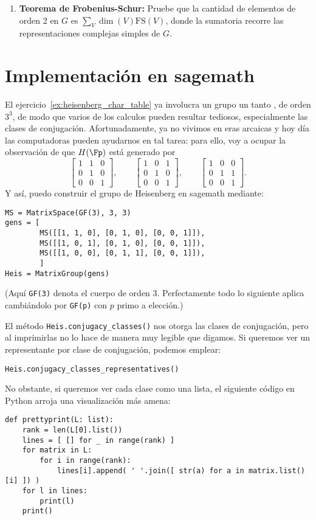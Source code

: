 \documentclass[11pt, reqno]{amsart}
\begin{document}
\begin{additional}
\begin{enumerate}
\begin{enumerate}
			\item \textbf{Teorema de Frobenius-Schur:}
				Pruebe que la cantidad de elementos de orden 2 en $G$ es $\sum_V \dim(V)\mathrm{FS}(V)$, donde la sumatoria
				recorre las representaciones complejas simples de $G$.
		\end{enumerate}
\end{enumerate}

\section{Implementación en \textsf{sagemath}}
El ejercicio~\ref{ex:heisenberg_char_table} ya involucra un grupo un tanto , de orden $3^3$, de modo que varios de los calculos pueden resultar tediosos,
especialmente las clases de conjugación.
Afortunadamente, ya no vivimos en eras arcaicas y hoy día las computadoras pueden ayudarnos en tal tarea:
para ello, voy a ocupar la observación de que $H(\Fp)$ está generado por
\[
	\begin{bmatrix}
		1 & 1 & 0 \\
		0 & 1 & 0 \\
		0 & 0 & 1
	\end{bmatrix}, \qquad
	\begin{bmatrix}
		1 & 0 & 1 \\
		0 & 1 & 0 \\
		0 & 0 & 1
	\end{bmatrix}, \qquad
	\begin{bmatrix}
		1 & 0 & 0 \\
		0 & 1 & 1 \\
		0 & 0 & 1
	\end{bmatrix}.
\]
Y así, puedo construir el grupo de Heisenberg en \textsf{sagemath} mediante:
\begin{verbatim}
MS = MatrixSpace(GF(3), 3, 3)
gens = [
        MS([[1, 1, 0], [0, 1, 0], [0, 0, 1]]),
        MS([[1, 0, 1], [0, 1, 0], [0, 0, 1]]),
        MS([[1, 0, 0], [0, 1, 1], [0, 0, 1]]),
        ]
Heis = MatrixGroup(gens)
\end{verbatim}
(Aquí \texttt{GF(3)} denota el cuerpo de orden 3. Perfectamente todo lo siguiente aplica cambiándolo por \texttt{GF(p)} con $p$ primo a elección.)

El método \texttt{Heis.conjugacy_classes()} nos otorga las clases de conjugación, pero al imprimirlas no lo hace de manera muy legible que digamos.
Si queremos ver un representante por clase de conjugación, podemos emplear:
\begin{verbatim}
Heis.conjugacy_classes_representatives()
\end{verbatim}
No obstante, si queremos ver cada clase como una lista, el siguiente código en \textsf{Python} arroja una visualización más amena:
\begin{verbatim}
def prettyprint(L: list):
    rank = len(L[0].list())
    lines = [ [] for _ in range(rank) ]
    for matrix in L:
        for i in range(rank):
            lines[i].append( ' '.join([ str(a) for a in matrix.list()[i] ]) )
    for l in lines:
        print(l)
    print()


\end{verbatim}
\end{additional}
\end{document}
